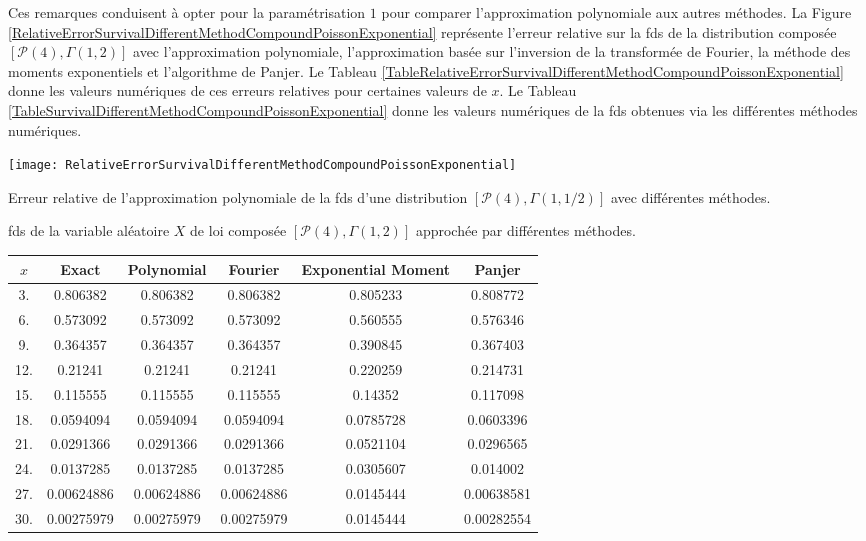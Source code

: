 Ces remarques conduisent à opter pour la paramétrisation $1$ pour comparer l\rq{}approximation polynomiale aux autres méthodes. La Figure \ref{RelativeErrorSurvivalDifferentMethodCompoundPoissonExponential} représente l\rq{}erreur relative sur la \gls{fds} de la distribution composée $\left[\mathcal{P}(4),\Gamma(1,2)\right]$ avec l\rq{}approximation polynomiale, l\rq{}approximation basée sur l\rq{}inversion de la transformée de Fourier, la méthode des moments exponentiels et l\rq{}algorithme de Panjer. Le Tableau \ref{TableRelativeErrorSurvivalDifferentMethodCompoundPoissonExponential} donne les valeurs numériques de ces erreurs relatives pour certaines valeurs de $x$. Le Tableau \ref{TableSurvivalDifferentMethodCompoundPoissonExponential} donne les valeurs numériques de la \gls{fds} obtenues via les différentes méthodes numériques.\\
\begin{figureth}
\texttt{[image: RelativeErrorSurvivalDifferentMethodCompoundPoissonExponential]}
\caption{Erreur relative de l'approximation polynomiale de la \gls{fds} d'une distribution  $\left[\mathcal{P}(4),\Gamma(1,1/2)\right]$ avec différentes méthodes.}		
\label{RelativeErrorSurvivalDifferentMethodCompoundPoissonExponential}
\end{figureth}
\begin{tableth}
		\caption[Approximations de la \gls{fds} d'une loi $\left(\mathcal{P}(4),\Gamma(1,2)\right)$]{\gls{fds} de la variable aléatoire $X$ de loi composée $\left[\mathcal{P}(4),\Gamma(1,2)\right]$ approchée par différentes méthodes.}
			\label{TableSurvivalDifferentMethodCompoundPoissonExponential}
		\begin{tabular}{|c||c|c|c|c|c|}
\hline
$x$ & Exact&Polynomial & Fourier & Exponential Moment &Panjer \\
\hline
\hline
 3. & 0.806382 & 0.806382 & 0.806382 & 0.805233 & 0.808772 \\
 6. & 0.573092 & 0.573092 & 0.573092 & 0.560555 & 0.576346 \\
 9. & 0.364357 & 0.364357 & 0.364357 & 0.390845 & 0.367403 \\
 12. & 0.21241 & 0.21241 & 0.21241 & 0.220259 & 0.214731 \\
 15. & 0.115555 & 0.115555 & 0.115555 & 0.14352 & 0.117098 \\
 18. & 0.0594094 & 0.0594094 & 0.0594094 & 0.0785728 & 0.0603396 \\
 21. & 0.0291366 & 0.0291366 & 0.0291366 & 0.0521104 & 0.0296565 \\
 24. & 0.0137285 & 0.0137285 & 0.0137285 & 0.0305607 & 0.014002 \\
 27. & 0.00624886 & 0.00624886 & 0.00624886 & 0.0145444 & 0.00638581 \\
 30. & 0.00275979 & 0.00275979 & 0.00275979 & 0.0145444 & 0.00282554 \\
\hline
		\end{tabular}
	\end{tableth}

